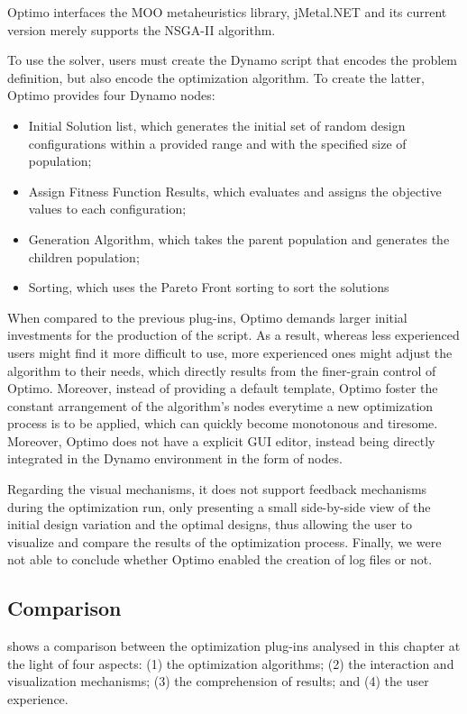 	Optimo interfaces the \ac{MOO} metaheuristics library, jMetal.NET and its current version merely supports the \ac{NSGA-II} algorithm\cite{Deb2002}.
	
	To use the solver, users must create the Dynamo script that encodes the problem definition, but also encode the optimization algorithm. To create the latter, Optimo provides four Dynamo nodes:
	\begin{itemize}
		\item Initial Solution list, which generates the initial set of random design configurations within a provided range and with the specified size of population;
		\item Assign Fitness Function Results, which evaluates and assigns the objective values to each configuration; 
		\item Generation Algorithm, which takes the parent population and generates the children population;
		\item Sorting, which uses the Pareto Front sorting to sort the solutions
	\end{itemize} 
	
	When compared to the previous plug-ins, Optimo demands larger initial investments for the production of the script. As a result, whereas less experienced users might find it more difficult to use, more experienced ones might adjust the algorithm to their needs, which directly results from the finer-grain control of Optimo. Moreover, instead of providing a default template, Optimo foster the constant arrangement of the algorithm's nodes everytime a new optimization process is to be applied, which can quickly become monotonous and tiresome. Moreover, Optimo does not have a explicit \ac{GUI} editor, instead being directly integrated in the Dynamo environment in the form of nodes.
	
	Regarding the visual mechanisms, it does not support feedback mechanisms during the optimization run, only presenting a small side-by-side view of the initial design variation and the optimal designs, thus allowing the user to visualize and compare the results of the optimization process. Finally, we were not able to conclude whether Optimo enabled the creation of log files or not. 
	
	\subsection{Comparison}
	
	 shows a comparison between the optimization plug-ins analysed in this chapter at the light of four aspects: (1) the optimization algorithms; (2) the interaction and visualization mechanisms; (3) the comprehension of results; and (4) the user experience.
	
